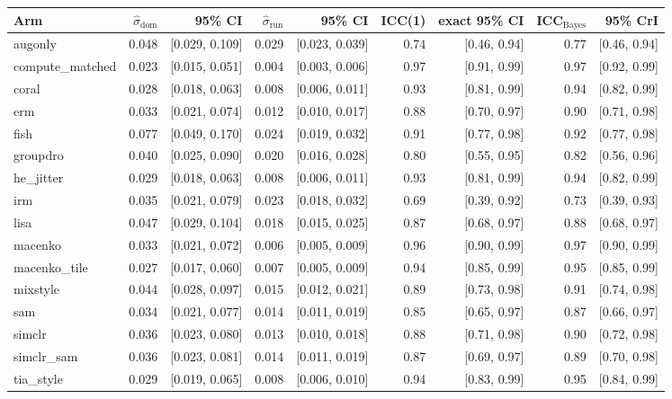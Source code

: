 \begin{tabular}{lrrrrrrrr}
\toprule
Arm & $\hat\sigma_\text{dom}$ & 95\% CI & $\hat\sigma_\text{run}$ & 95\% CI & ICC(1) & exact 95\% CI & ICC$_\text{Bayes}$ & 95\% CrI \\
\midrule
augonly & 0.048 & [0.029, 0.109] & 0.029 & [0.023, 0.039] & 0.74 & [0.46, 0.94] & 0.77 & [0.46, 0.94] \\
compute\_matched & 0.023 & [0.015, 0.051] & 0.004 & [0.003, 0.006] & 0.97 & [0.91, 0.99] & 0.97 & [0.92, 0.99] \\
coral & 0.028 & [0.018, 0.063] & 0.008 & [0.006, 0.011] & 0.93 & [0.81, 0.99] & 0.94 & [0.82, 0.99] \\
erm & 0.033 & [0.021, 0.074] & 0.012 & [0.010, 0.017] & 0.88 & [0.70, 0.97] & 0.90 & [0.71, 0.98] \\
fish & 0.077 & [0.049, 0.170] & 0.024 & [0.019, 0.032] & 0.91 & [0.77, 0.98] & 0.92 & [0.77, 0.98] \\
groupdro & 0.040 & [0.025, 0.090] & 0.020 & [0.016, 0.028] & 0.80 & [0.55, 0.95] & 0.82 & [0.56, 0.96] \\
he\_jitter & 0.029 & [0.018, 0.063] & 0.008 & [0.006, 0.011] & 0.93 & [0.81, 0.99] & 0.94 & [0.82, 0.99] \\
irm & 0.035 & [0.021, 0.079] & 0.023 & [0.018, 0.032] & 0.69 & [0.39, 0.92] & 0.73 & [0.39, 0.93] \\
lisa & 0.047 & [0.029, 0.104] & 0.018 & [0.015, 0.025] & 0.87 & [0.68, 0.97] & 0.88 & [0.68, 0.97] \\
macenko & 0.033 & [0.021, 0.072] & 0.006 & [0.005, 0.009] & 0.96 & [0.90, 0.99] & 0.97 & [0.90, 0.99] \\
macenko\_tile & 0.027 & [0.017, 0.060] & 0.007 & [0.005, 0.009] & 0.94 & [0.85, 0.99] & 0.95 & [0.85, 0.99] \\
mixstyle & 0.044 & [0.028, 0.097] & 0.015 & [0.012, 0.021] & 0.89 & [0.73, 0.98] & 0.91 & [0.74, 0.98] \\
sam & 0.034 & [0.021, 0.077] & 0.014 & [0.011, 0.019] & 0.85 & [0.65, 0.97] & 0.87 & [0.66, 0.97] \\
simclr & 0.036 & [0.023, 0.080] & 0.013 & [0.010, 0.018] & 0.88 & [0.71, 0.98] & 0.90 & [0.72, 0.98] \\
simclr\_sam & 0.036 & [0.023, 0.081] & 0.014 & [0.011, 0.019] & 0.87 & [0.69, 0.97] & 0.89 & [0.70, 0.98] \\
tia\_style & 0.029 & [0.019, 0.065] & 0.008 & [0.006, 0.010] & 0.94 & [0.83, 0.99] & 0.95 & [0.84, 0.99] \\
\bottomrule
\end{tabular}
